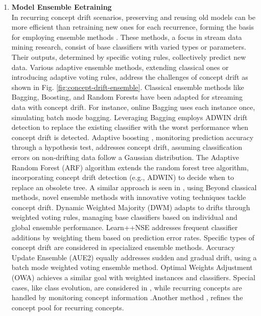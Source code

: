 \begin{enumerate}[label=\Alph*.]
\item \textbf{Model Ensemble Eetraining} \\
In recurring concept drift scenarios, preserving and reusing old models can be more efficient than retraining new ones for each recurrence, forming the basis for employing ensemble methods \cite{sun2018concept}. These methods, a focus in stream data mining research, consist of base classifiers with varied types or parameters. Their outputs, determined by specific voting rules, collectively predict new data. Various adaptive ensemble methods, extending classical ones or introducing adaptive voting rules, address the challenges of concept drift as shown in Fig. \ref{fig:concept-drift-ensemble}.
Classical ensemble methods like Bagging, Boosting, and Random Forests have been adapted for streaming data with concept drift. For instance, online Bagging \cite{oza2001experimental} uses each instance once, simulating batch mode bagging. Leveraging Bagging \cite{bifet2009new} employs ADWIN drift detection to replace the existing classifier with the worst performance when concept drift is detected.
 Adaptive boosting \cite{chu2004fast}, monitoring prediction accuracy through a hypothesis test, addresses concept drift, assuming classification errors on non-drifting data follow a Gaussian distribution. The Adaptive Random Forest (ARF) algorithm \cite{gomes2017adaptive} extends the random forest tree algorithm, incorporating concept drift detection (e.g., ADWIN) to decide when to replace an obsolete tree. A similar approach is seen in \cite{li2015learning}, using Beyond classical methods, novel ensemble methods with innovative voting techniques tackle concept drift. Dynamic Weighted Majority (DWM) \cite{kolter2007dynamic} adapts to drifts through weighted voting rules, managing base classifiers based on individual and global ensemble performance. Learn++NSE \cite{elwell2011incremental} addresses frequent classifier additions by weighting them based on prediction error rates.
 Specific types of concept drift are considered in specialized ensemble methods. Accuracy Update Ensemble (AUE2) \cite{brzezinski2013reacting} equally addresses sudden and gradual drift, using a batch mode weighted voting ensemble method. Optimal Weights Adjustment (OWA) \cite{zhang2008categorizing} achieves a similar goal with weighted instances and classifiers. Special cases, like class evolution, are considered in \cite{sun2016online}, while recurring concepts are handled by monitoring concept information \cite{gomes2013mining, gama2014survey} .Another method \cite{ahmadi2018modeling}, refines the concept pool for recurring concepts.
 

\end{enumerate}

